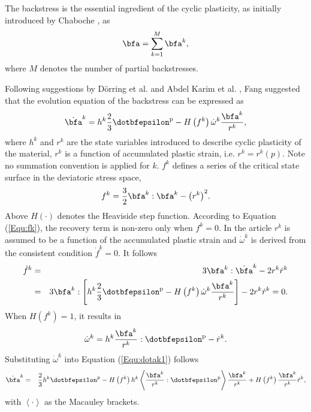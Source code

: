 The backstress is the essential ingredient of the cyclic plasticity, as initially introduced by Chaboche \cite{Chaboche1986149}, as
\begin{equation}
\bfa = \sum\limits_{k = 1}^M {{\bfa^k}},
\end{equation}
where $M$ denotes the number of partial backstresses.

Following suggestions by D\"orring et al. \cite{Doerring2003} and Abdel Karim et al. \cite{AbdelKarim20051303}, Fang \cite{fang2015cyclic} suggested that the evolution equation of the backstress can be expressed as
\begin{equation}
\label{Equ:dotak1}
{\dot\bfa^k} = {h^k}\frac{2}{3}{\dotbfepsilon^{\rm{p}}} - H\left( {{f^k}} \right){\dot \omega ^k}\frac{{{\bfa^k}}}{{{r^k}}},
\end{equation}
where ${{{h}}^k} $ and ${{{r}}^k} $ are the state variables introduced to describe cyclic plasticity of the material, $r^k$ is a function of accumulated plastic strain, i.e. ${r^k} = {r^k}\left( p \right)$.  Note no summation convention is applied for $k$. ${{{f}}^k} $ defines a series of the critical state surface in the deviatoric stress space,
\begin{equation}
\label{Equ:fk}
{f^k} = \frac{3}{2}{\bfa^k}:{\bfa^k} - {\left( {{r^k}} \right)^2}.
\end{equation}
Above  $H(\cdot)$ denotes the Heaviside step function. According to Equation (\ref{Equ:fk}), the recovery term is non-zero only when ${f^k} = 0$. In the article $r^k$ is assumed to be a function of the accumulated plastic strain and ${\dot \omega ^k}$ is derived from the consistent condition ${\dot f^k} = 0$. It follows
\begin{eqnarray}
\label{Equ:dotfk}
{\dot f^k} &=& 3{\bfa^k}:{\dot\bfa^k} - 2{r^k}{\dot r^k} \\ \nonumber
&=& 3{\bfa^k}:\left[ {{h^k}\frac{2}{3}{{\dotbfepsilon}^{\rm{p}}} - H\left( {{f^k}} \right){{\dot \omega }^k}\frac{{{\bfa^k}}}{{{r^k}}}} \right] - 2{r^k}{\dot r^k} = 0.
\end{eqnarray}
When $H\left( {{f^k}} \right) = 1$, it results in
\begin{equation}
\label{Equ:dotomegak}
{\dot \omega ^k} = {h^k}\frac{{{\bfa^k}}}{{{r^k}}}:{\dotbfepsilon^{\rm{p}}} - {\dot r^k}.
\end{equation}
Substituting ${\dot \omega ^k}$ into Equation (\ref{Equ:dotak1}) follows
\begin{eqnarray}
\label{Equ:dotak2}
{\dot\bfa^k} &=& \frac{2}{3}{h^k}{\dotbfepsilon^{\rm{p}}} - H\left( {{f^k}} \right){h^k}\left\langle {\frac{{{\bfa^k}}}{{{r^k}}}:{{\dotbfepsilon}^{\rm{p}}}} \right\rangle \frac{{{\bfa^k}}}{{{r^k}}} + H\left( {{f^k}} \right)\frac{{{\bfa^k}}}{{{r^k}}}{\dot r^k},
\end{eqnarray}
with $\left<\cdot\right>$ as the Macauley brackets.


